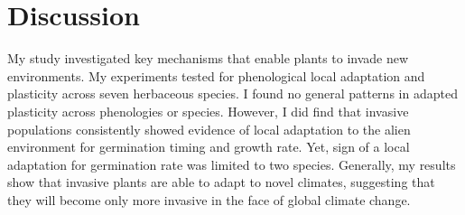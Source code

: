 \documentclass[12pt]{article}\usepackage[]{graphicx}\usepackage[]{color}
\begin{document}
%	
%
%	
		
	\section{Discussion} 
	
	My study investigated key mechanisms that enable plants to invade new environments. My experiments tested for phenological local adaptation and plasticity across seven herbaceous species. I found no general patterns in adapted plasticity across phenologies or species.  However, I did find that invasive populations consistently showed evidence of local adaptation to the alien environment for germination timing and growth rate. Yet, sign of a local adaptation for germination rate was limited to two species.  Generally, my results show that invasive plants are able to adapt to novel climates, suggesting that they will become only more invasive in the face of global climate change. 
	
\end{document}
